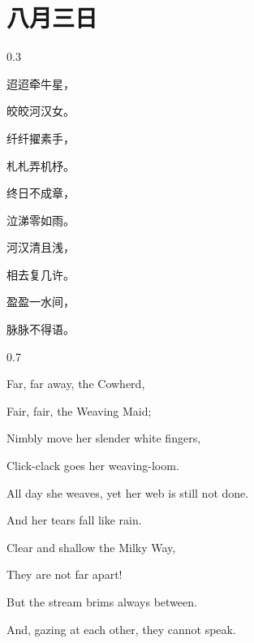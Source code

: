 \section{八月三日}
 {0.3\linewidth}
 {迢迢牵牛星，
 	
 	皎皎河汉女。
 	
 	 纤纤擢素手，
 	 
 	 札札弄机杼。 
 	 
 	 终日不成章，
 	 
 	 泣涕零如雨。
 	 
 	  河汉清且浅，
 	  
 	  相去复几许。 
 	  
 	  盈盈一水间，
 	  
 	  脉脉不得语。}
 {0.7\linewidth}
 { 	
 	Far, far away, the Cowherd, 
 	
 	Fair, fair, the Weaving Maid;
 	
 	 Nimbly move her slender white fingers, 
 	 
 	 Click-clack goes her weaving-loom.
 	 
 	 
 	All day she weaves, yet her web is still not done.
 	
 	 And her tears fall like rain. 
 	 
 	 Clear and shallow the Milky Way, 
 	 
 	 They are not far apart! 
 	 
 	 But the stream brims always between. 
 	 
 	 And, gazing at each other, they cannot speak.}
